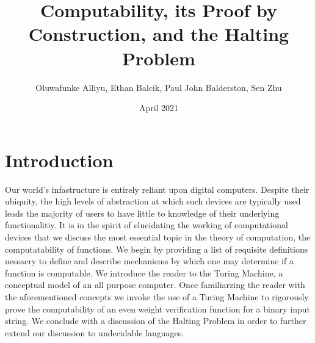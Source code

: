 \documentclass{article}
\title{Computability, its Proof by Construction, and the Halting Problem}
\author{Oluwafunke Alliyu, Ethan Balcik, Paul John Balderston, Sen Zhu}
\date{April 2021}
\begin{document}
\theoremstyle{definition}
\newtheorem{exmp}{Example}[section]
\newtheorem{defin}{Definition}[section]
\newtheorem{prf}{Proof}[section]

\maketitle

\section{Introduction}
Our world’s infastructure is entirely reliant upon digital computers. Despite
their ubiquity, the high levels of abstraction at which such devices are typically
used leads the majority of users to have little to knowledge of their underlying
functionalitiy. It is in the spirit of elucidating the working of computational
devices that we discuss the most essential topic in the theory of computation, the
computatability of functions. We begin by providing a list of requisite definitions
nessacry to define and describe mechanisms by which one may determine if a
function is computable. We introduce the reader to the Turing Machine, a
conceptual model of an all purpose computer. Once familiarzing the reader
with the aforementioned concepts we invoke the use of a Turing Machine to
rigorously prove the computability of an even weight verification function for
a binary input string. We conclude with a discussion of the Halting Problem in
order to further extend our discussion to undecidable languages. \cite{1}
\end{document}
